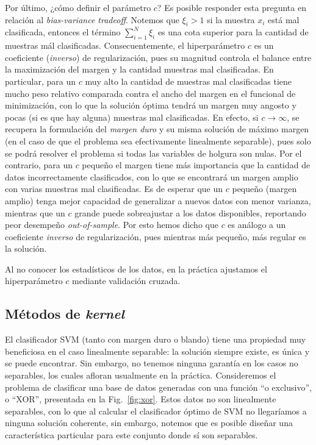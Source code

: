 Por último, ¿cómo definir el parámetro $c$? Es posible responder esta pregunta en relación al \textit{bias-variance tradeoff}. Notemos que $\xi_i>1$ si la muestra $x_i$ está mal clasificada, entonces el término $\sum_{i=1}^{N} \xi_i$ es una cota superior para la cantidad de muestras mál clasificadas. Consecuentemente, el hiperparámetro $c$ es un coeficiente (\emph{inverso}) de regularización, pues su magnitud controla el balance entre la maximización del margen y la cantidad muestras mal clasificadas. En particular, para un $c$ muy alto la cantidad de muestras mal clasificadas tiene mucho peso relativo comparada contra el ancho del margen en el funcional de minimización, con lo que la solución óptima tendrá un margen muy angosto y pocas (si es que hay alguna) muestras mal clasificadas. En efecto, si $c\to\infty$, se recupera la formulación del \emph{margen duro} y su misma solución de máximo margen (en el caso de que el problema sea efectivamente linealmente separable), pues solo se podrá resolver el problema si todas las variables de holgura son nulas. Por el contrario, para un $c$ pequeño el margen tiene más importancia que la cantidad de datos incorrectamente clasificados, con lo que se encontrará un margen amplio con varias muestras mal clasificadas. Es de esperar que un $c$ pequeño (margen amplio) tenga mejor capacidad de generalizar a nuevos datos con menor varianza, mientras que un $c$ grande puede sobreajustar a los datos disponibles, reportando peor desempeño \emph{out-of-sample}. Por esto hemos dicho que $c$ es análogo a un coeficiente \emph{inverso} de regularización, pues mientras más pequeño, más regular es la solución. 

Al no conocer los estadísticos de los datos, en la práctica ajustamos el hiperparámetro $c$ mediante validación cruzada.

\subsection{Métodos de \emph{kernel}}

El clasificador SVM (tanto con margen duro o blando) tiene una propiedad muy beneficiosa en el caso linealmente separable: la solución siempre existe, es única y se puede encontrar. Sin embargo, no tenemos ninguna garantía en los casos no separables, los cuales afloran usualmente en la práctica. Consideremos el problema de clasificar una base de datos generadas con una función ``o exclusivo'', o ``XOR'', presentada en la Fig.~\ref{fig:xor}. Estos datos no son linealmente separables, con lo que al calcular el clasificador óptimo  de SVM no llegaríamos a ninguna solución coherente, sin embargo, notemos que es posible diseñar una característica particular para este conjunto donde sí son separables. 

